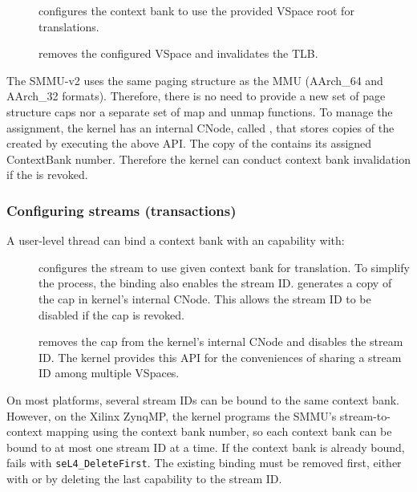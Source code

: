 \begin{description}
    \item[] configures
        the context bank to use the provided VSpace root for translations.
    \item[] removes
        the configured VSpace and invalidates the TLB.
\end{description}

The SMMU-v2 uses the same paging structure as the MMU (AArch\_64 and AArch\_32
formats). Therefore, there is no need to provide a new set of page structure caps
nor a separate set of map and unmap functions. To manage the assignment, the
kernel has an internal CNode, called , that stores copies of the
 created by executing the above API. The copy of the
 contains its assigned ContextBank number. Therefore the kernel
can conduct context bank invalidation if the  is revoked.


\subsubsection{Configuring streams (transactions)}
\label{sec:smmuv2-configuring-streams-transactions}

A user-level thread can bind a context bank with an 
capability with:
\begin{description}
    \item[] configures the stream
        to use given context bank for translation. To simplify the process, the
        binding also enables the stream ID.  
        generates a copy of the  cap in kernel's internal
        CNode. This allows the stream ID to be disabled if the
         cap is revoked.
    \item[] removes the
         cap from the kernel's internal CNode and disables
        the stream ID. The kernel provides this API for the conveniences of
        sharing a stream ID among multiple VSpaces.
\end{description}

On most platforms, several stream IDs can be bound to the same context bank.
However, on the Xilinx ZynqMP, the kernel programs the SMMU's
stream-to-context mapping using the context bank number, so each context bank
can be bound to at most one stream ID at a time. If the context bank is already
bound,  fails with
\texttt{seL4\_DeleteFirst}. The existing binding must be removed first, either
with  or by deleting the
last capability to the stream ID.

